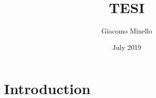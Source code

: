 \documentclass{article}
\title{TESI}
\author{Giacomo Minello}
\date{July 2019}
\begin{document}
\maketitle

\section{Introduction}
\end{document}
